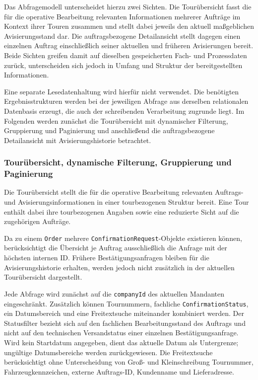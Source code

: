 \documentclass[
  12pt,
  a4paper,
  oneside
]{article}
\begin{document}
Das Abfragemodell unterscheidet hierzu zwei Sichten. Die Tourübersicht fasst
die für die operative Bearbeitung relevanten Informationen mehrerer Aufträge
im Kontext ihrer Touren zusammen und stellt dabei jeweils den aktuell
maßgeblichen Avisierungsstand dar. Die auftragsbezogene Detailansicht stellt
dagegen einen einzelnen Auftrag einschließlich seiner aktuellen und früheren
Avisierungen bereit. Beide Sichten greifen damit auf dieselben gespeicherten
Fach- und Prozessdaten zurück, unterscheiden sich jedoch in Umfang und Struktur
der bereitgestellten Informationen.

Eine separate Lesedatenhaltung wird hierfür nicht verwendet. Die benötigten
Ergebnisstrukturen werden bei der jeweiligen Abfrage aus derselben relationalen
Datenbasis erzeugt, die auch der schreibenden Verarbeitung zugrunde liegt. Im
Folgenden werden zunächst die Tourübersicht mit dynamischer Filterung,
Gruppierung und Paginierung und anschließend die auftragsbezogene Detailansicht
mit Avisierungshistorie betrachtet.

\subsubsection{Tourübersicht, dynamische Filterung, Gruppierung und Paginierung}
\label{sec:touruebersicht}

Die Tourübersicht stellt die für die operative Bearbeitung relevanten
Auftrags- und Avisierungsinformationen in einer tourbezogenen Struktur bereit.
Eine Tour enthält dabei ihre tourbezogenen Angaben sowie eine reduzierte Sicht
auf die zugehörigen Aufträge.

Da zu einem \texttt{Order} mehrere \texttt{ConfirmationRequest}-Objekte
existieren können, berücksichtigt die Übersicht je Auftrag ausschließlich die
Anfrage mit der höchsten internen ID. Frühere Bestätigungsanfragen bleiben
für die Avisierungshistorie erhalten, werden jedoch nicht zusätzlich in der
aktuellen Tourübersicht dargestellt.

Jede Abfrage wird zunächst auf die \texttt{companyId} des aktuellen Mandanten
eingeschränkt. Zusätzlich können Tournummern, fachliche
\texttt{ConfirmationStatus}, ein Datumsbereich und eine Freitextsuche
miteinander kombiniert werden. Der Statusfilter bezieht sich auf den
fachlichen Bearbeitungsstand des Auftrags und nicht auf den technischen
Versandstatus einer einzelnen Bestätigungsanfrage. Wird kein Startdatum
angegeben, dient das aktuelle Datum als Untergrenze; ungültige Datumsbereiche
werden zurückgewiesen. Die Freitextsuche berücksichtigt ohne Unterscheidung
von Groß- und Kleinschreibung Tournummer, Fahrzeugkennzeichen, externe
Auftrags-ID, Kundenname und Lieferadresse.
\end{document}
